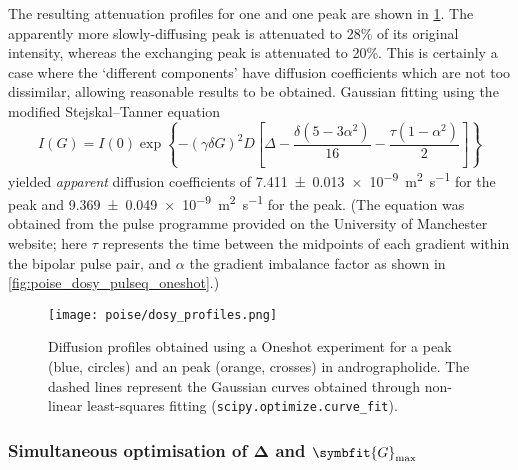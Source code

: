 The resulting attenuation profiles for one  and one  peak are shown in \cref{fig:poise_diffusion_profiles}.
The apparently more slowly-diffusing  peak is attenuated to 28\% of its original intensity, whereas the exchanging  peak is attenuated to 20\%.
This is certainly a case where the `different components' have diffusion coefficients which are not too dissimilar, allowing reasonable results to be obtained.
Gaussian fitting using the modified Stejskal--Tanner equation
\begin{equation}
    \label{eq:stejskal_tanner_oneshot}
    I(G) = I(0) \exp\left\{-(\gamma\delta G)^2 D \left[\Delta - \frac{\delta(5 - 3\alpha^2)}{16} - \frac{\tau(1-\alpha^2)}{2}\right]\right\}
\end{equation}
yielded \textit{apparent} diffusion coefficients of \qty{7.411(13)e-9}{\m\squared\per\s} for the  peak and \qty{9.369(49)e-9}{\m\squared\per\s} for the  peak.
(The equation was obtained from the pulse programme provided on the University of Manchester website; here $\tau$ represents the time between the midpoints of each gradient within the bipolar pulse pair, and $\alpha$ the gradient imbalance factor as shown in \cref{fig:poise_dosy_pulseq_oneshot}.)

\begin{figure}[htb]
    \centering
    \texttt{[image: poise/dosy\_profiles.png]}%
    \caption[Diffusion profiles of  and  peaks after optimisation of DOSY parameters]{
        Diffusion profiles obtained using a Oneshot experiment for a  peak (blue, circles) and an  peak (orange, crosses) in andrographolide.
        The dashed lines represent the Gaussian curves obtained through non-linear least-squares fitting (\texttt{scipy.optimize.curve\_fit}).
    }
    \label{fig:poise_diffusion_profiles}
\end{figure}




\subsubsection{Simultaneous optimisation of $\symbf{\Delta}$ and $\symbfit{G}_\text{max}$}


